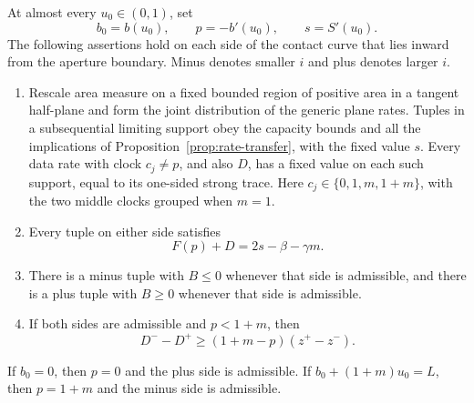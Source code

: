 \begin{lemma}
\label{lem:closure-contact-tuples}
At almost every $u_0\in(0,1)$, set
\[
 b_0=b(u_0),\qquad p=-b'(u_0),\qquad s=S'(u_0).
\]
The following assertions hold on each side of the contact curve that
lies inward from the aperture boundary.  Minus denotes smaller $i$ and
plus denotes larger $i$.
\begin{enumerate}
\item Rescale area measure on a fixed bounded region of positive area
in a tangent half-plane and form the joint distribution of the generic
plane rates.  Tuples in a subsequential limiting support obey the
capacity bounds and all the implications
of Proposition~\ref{prop:rate-transfer}, with the fixed value $s$.
Every data rate with clock $c_j\ne p$, and also $D$, has a fixed value
on each such support, equal to its one-sided strong trace.  Here
$c_j\in\{0,1,m,1+m\}$, with the two middle clocks grouped when $m=1$.
\item Every tuple on either side satisfies
\begin{equation}
 F(p)+D=2s-\beta-\gamma m.
 \label{eq:closure-contact-identity}
\end{equation}
\item There is a minus tuple with $B\le0$ whenever that side is
admissible, and there is a plus tuple with $B\ge0$ whenever that side
is admissible.
\item If both sides are admissible and $p<1+m$, then
\begin{equation}
 D^- -D^+\ge (1+m-p)(z^+-z^-).
 \label{eq:closure-jump}
\end{equation}
\end{enumerate}
If $b_0=0$, then $p=0$ and the plus side is admissible.  If
$b_0+(1+m)u_0=L$, then $p=1+m$ and the minus side is admissible.
\end{lemma}

